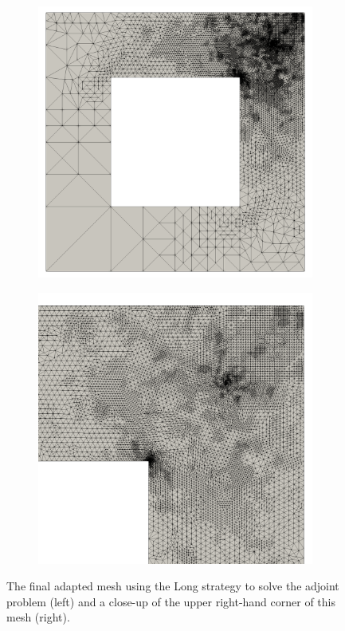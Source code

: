 %
\begin{figure}[ht!]
\centering
\begin{subfigure}{.5\textwidth}
\centering
\includegraphics[width=.99\linewidth]{img/refine_squarehole_long.png}
\end{subfigure}%
\begin{subfigure}{0.5\textwidth}
\centering
\includegraphics[width=.99\linewidth]{img/refine_squarehole_long_close.png}
\end{subfigure}
\caption{The final adapted mesh using the Long strategy to
solve the adjoint problem (left) and a close-up of the upper right-hand
corner of this mesh (right).}
\label{fig:refine_long_adapted}
\end{figure}

